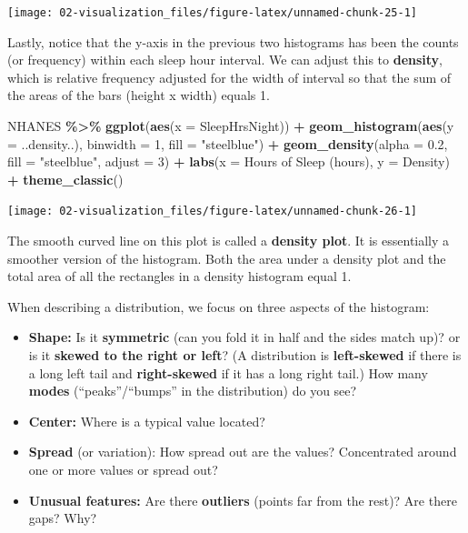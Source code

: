 \documentclass[
]{book}
\newenvironment{Shaded}{\begin{snugshade}}{\end{snugshade}}
\newcommand{\AttributeTok}[1]{\textcolor[rgb]{0.13,0.29,0.53}{#1}}
\newcommand{\DecValTok}[1]{\textcolor[rgb]{0.00,0.00,0.81}{#1}}
\newcommand{\FloatTok}[1]{\textcolor[rgb]{0.00,0.00,0.81}{#1}}
\newcommand{\FunctionTok}[1]{\textcolor[rgb]{0.13,0.29,0.53}{\textbf{#1}}}
\newcommand{\NormalTok}[1]{#1}
\newcommand{\SpecialCharTok}[1]{\textcolor[rgb]{0.81,0.36,0.00}{\textbf{#1}}}
\newcommand{\StringTok}[1]{\textcolor[rgb]{0.31,0.60,0.02}{#1}}
\providecommand{\tightlist}{%
  \setlength{\itemsep}{0pt}\setlength{\parskip}{0pt}}
\begin{document}
\begin{center}\texttt{[image: 02-visualization\_files/figure-latex/unnamed-chunk-25-1]} \end{center}

Lastly, notice that the y-axis in the previous two histograms has been the counts (or frequency) within each sleep hour interval. We can adjust this to \textbf{density}, which is relative frequency adjusted for the width of interval so that the sum of the areas of the bars (height x width) equals 1.

\begin{Shaded}
\begin{Highlighting}[]
\NormalTok{NHANES }\SpecialCharTok{\%\textgreater{}\%}
    \FunctionTok{ggplot}\NormalTok{(}\FunctionTok{aes}\NormalTok{(}\AttributeTok{x =}\NormalTok{ SleepHrsNight)) }\SpecialCharTok{+}
    \FunctionTok{geom\_histogram}\NormalTok{(}\FunctionTok{aes}\NormalTok{(}\AttributeTok{y =}\NormalTok{ ..density..), }\AttributeTok{binwidth =} \DecValTok{1}\NormalTok{, }\AttributeTok{fill =} \StringTok{"steelblue"}\NormalTok{) }\SpecialCharTok{+} 
    \FunctionTok{geom\_density}\NormalTok{(}\AttributeTok{alpha =} \FloatTok{0.2}\NormalTok{, }\AttributeTok{fill =} \StringTok{"steelblue"}\NormalTok{, }\AttributeTok{adjust =} \DecValTok{3}\NormalTok{) }\SpecialCharTok{+} 
    \FunctionTok{labs}\NormalTok{(}\AttributeTok{x =} \StringTok{\textquotesingle{}Hours of Sleep (hours)\textquotesingle{}}\NormalTok{, }\AttributeTok{y =} \StringTok{\textquotesingle{}Density\textquotesingle{}}\NormalTok{) }\SpecialCharTok{+} 
    \FunctionTok{theme\_classic}\NormalTok{() }
\end{Highlighting}
\end{Shaded}

\begin{center}\texttt{[image: 02-visualization\_files/figure-latex/unnamed-chunk-26-1]} \end{center}

The smooth curved line on this plot is called a \textbf{density plot}. It is essentially a smoother version of the histogram. Both the area under a density plot and the total area of all the rectangles in a density histogram equal 1.

When describing a distribution, we focus on three aspects of the histogram:

\begin{itemize}
\tightlist
\item
  \textbf{Shape:} Is it \textbf{symmetric} (can you fold it in half and the sides match up)? or is it \textbf{skewed to the right or left}? (A distribution is \textbf{left-skewed} if there is a long left tail and \textbf{right-skewed} if it has a long right tail.) How many \textbf{modes} (``peaks''/``bumps'' in the distribution) do you see?
\item
  \textbf{Center:} Where is a typical value located?
\item
  \textbf{Spread} (or variation): How spread out are the values? Concentrated around one or more values or spread out?
\item
  \textbf{Unusual features:} Are there \textbf{outliers} (points far from the rest)? Are there gaps? Why?
\end{itemize}
\end{document}
